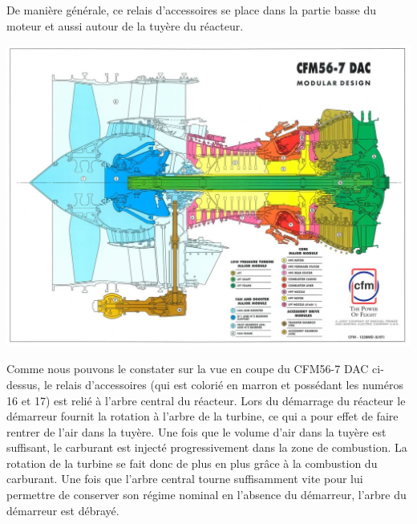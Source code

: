 \documentclass{config}
\begin{document}
\begin{spacing}{1.2}
De manière générale, ce relais d'accessoires se place dans la partie basse du moteur et aussi autour de la tuyère du réacteur.

\begin{center}
\includegraphics[scale=0.6]{CFM56-coupe.jpg}
\end{center}

Comme nous pouvons le constater sur la vue en coupe du CFM56-7 DAC ci-dessus, le relais d'accessoires (qui est colorié en marron et possédant les numéros 16 et 17) est relié à l'arbre central du réacteur. Lors du démarrage du réacteur le démarreur fournit la rotation à l'arbre de la turbine, ce qui a pour effet de faire rentrer de l'air dans la tuyère. Une fois que le volume d'air dans la tuyère est suffisant, le carburant est injecté progressivement dans la zone de combustion. La rotation de la turbine se fait donc de plus en plus grâce à la combustion du carburant. Une fois que l'arbre central tourne suffisamment vite pour lui permettre de conserver son régime nominal en l'absence du démarreur, l'arbre du démarreur est débrayé.



\end{spacing}
\end{document}
